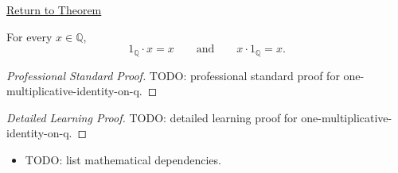 \newpage
{}
\label{prf:one-multiplicative-identity-on-q}

\begin{remark*}[Return]
\hyperref[thm:one-multiplicative-identity-on-q]{Return to Theorem}
\end{remark*}

\begin{theorem*}
For every $x\in\mathbb{Q}$,
\[
1_{\mathbb{Q}}\cdot x=x
\qquad\text{and}\qquad
x\cdot 1_{\mathbb{Q}}=x.
\]
\end{theorem*}

\begin{proof}[Professional Standard Proof]
\LRAProofBodyStart
TODO: professional standard proof for one-multiplicative-identity-on-q.
\end{proof}

\begin{proof}[Detailed Learning Proof]
\LRAProofBodyStart
TODO: detailed learning proof for one-multiplicative-identity-on-q.
\end{proof}

\begin{remark*}
\end{remark*}

\begin{dependencies}
\begin{itemize}
  \item TODO: list mathematical dependencies.
\end{itemize}
\end{dependencies}

\clearpage
